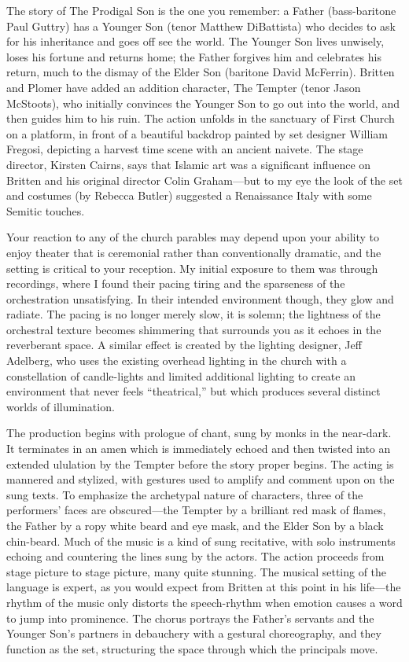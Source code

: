 The story of The Prodigal Son is the one you remember: a Father (bass-baritone Paul Guttry) has a Younger Son (tenor Matthew DiBattista) who decides to ask for his inheritance and goes off see the world. The Younger Son lives unwisely, loses his fortune and returns home; the Father forgives him and celebrates his return, much to the dismay of the Elder Son (baritone David McFerrin). Britten and Plomer have added an addition character, The Tempter (tenor Jason McStoots), who initially convinces the Younger Son to go out into the world, and then guides him to his ruin. The action unfolds in the sanctuary of First Church on a platform, in front of a beautiful backdrop painted by set designer William Fregosi, depicting a harvest time scene with an ancient naivete. The stage director, Kirsten Cairns, says that Islamic art was a significant influence on Britten and his original director Colin Graham—but to my eye the look of the set and costumes (by Rebecca Butler) suggested a Renaissance Italy with some Semitic touches.

Your reaction to any of the church parables may depend upon your ability to enjoy theater that is ceremonial rather than conventionally dramatic, and the setting is critical to your reception. My initial exposure to them was through recordings, where I found their pacing tiring and the sparseness of the orchestration unsatisfying. In their intended environment though, they glow and radiate. The pacing is no longer merely slow, it is solemn; the lightness of the orchestral texture becomes shimmering that surrounds you as it echoes in the reverberant space. A similar effect is created by the lighting designer, Jeff Adelberg, who uses the existing overhead lighting in the church with a constellation of candle-lights and limited additional lighting to create an environment that never feels “theatrical,” but which produces several distinct worlds of illumination.

The production begins with prologue of chant, sung by monks in the near-dark. It terminates in an amen which is immediately echoed and then twisted into an extended ululation by the Tempter before the story proper begins. The acting is mannered and stylized, with gestures used to amplify and comment upon on the sung texts. To emphasize the archetypal nature of characters, three of the performers’ faces are obscured—the Tempter by a brilliant red mask of flames, the Father by a ropy white beard and eye mask, and the Elder Son by a black chin-beard. Much of the music is a kind of sung recitative, with solo instruments echoing and countering the lines sung by the actors. The action proceeds from stage picture to stage picture, many quite stunning. The musical setting of the language is expert, as you would expect from Britten at this point in his life—the rhythm of the music only distorts the speech-rhythm when emotion causes a word to jump into prominence. The chorus portrays the Father’s servants and the Younger Son’s partners in debauchery with a gestural choreography, and they function as the set, structuring the space through which the principals move.

